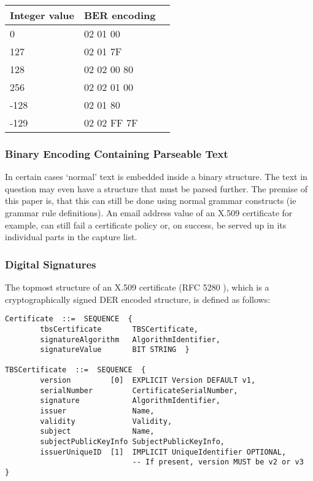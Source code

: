 \begin{center}
\begin{tabular}{|l|l|l|}
\hline
\textbf{Integer value} & \textbf{BER encoding} \\
\hline
0 & 02 01 00 \\
\hline
127 & 02 01 7F \\
\hline
128 & 02 02 00 80 \\
\hline
256 & 02 02 01 00 \\
\hline
-128 & 02 01 80 \\
\hline
-129 & 02 02 FF 7F \\
\hline
\end{tabular}
\end{center}

\subsubsection{Binary Encoding Containing Parseable Text}

In certain cases ‘normal’ text is embedded inside a binary structure. 
The text in question may even have a structure that must be parsed 
further. The premise of this paper is, that this can still be done using 
normal grammar constructs (ie grammar rule definitions). An email address 
value of an X.509 certificate for example, can still fail a certificate 
policy or, on success, be served up in its individual parts in the capture 
list.

\subsubsection{Digital Signatures}
The topmost structure of an X.509 certificate (RFC 5280 \cite{bib:cert}),
which is a cryptographically signed DER encoded structure,
is defined as follows:

\label{ref:tbscert}

\begin{changemargin}{-60mm}{0mm}
\begin{myquote}
\begin{verbatim}
Certificate  ::=  SEQUENCE  {
        tbsCertificate       TBSCertificate,
        signatureAlgorithm   AlgorithmIdentifier,
        signatureValue       BIT STRING  }

TBSCertificate  ::=  SEQUENCE  {
        version         [0]  EXPLICIT Version DEFAULT v1,
        serialNumber         CertificateSerialNumber,
        signature            AlgorithmIdentifier,
        issuer               Name,
        validity             Validity,
        subject              Name,
        subjectPublicKeyInfo SubjectPublicKeyInfo,
        issuerUniqueID  [1]  IMPLICIT UniqueIdentifier OPTIONAL,
                             -- If present, version MUST be v2 or v3
}
\end{verbatim}
\end{myquote}
\end{changemargin}

